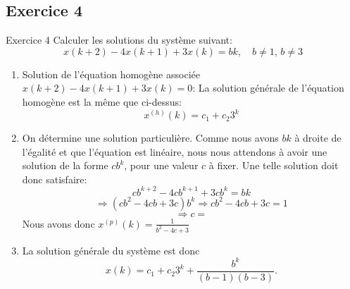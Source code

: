          \subsection{Exercice 4}
            \begin{exercise}{Exercice 4}
                Calculer les solutions du système suivant: 
                \begin{equation}
                    x(k+2)-4x(k+1)+3x(k) = bk, \quad b \neq 1, \, b \neq 3
                \end{equation}
            \end{exercise}
            \begin{enumerate}
                \item Solution de l’équation homogène associée $x(k+2)-4x(k+1)+3x(k) = 0$:
                La solution générale de l’équation homogène est la même que ci-dessus:
                \begin{equation}
                x^{(h)}(k) = c_1+c_2 3^k
                \end{equation}
                \item On détermine une solution particulière. Comme nous avons $bk$ à droite de l’égalité et que l’équation est linéaire, nous nous attendons à avoir une solution de la forme $c b^k$, pour une valeur $c$ à fixer. Une telle solution doit donc satisfaire:
                \begin{equation}
                    cb^{k+2}-4cb^{k+1}+3cb^{k} = bk
                \end{equation}
                \begin{equation}
                    \Rightarrow (cb^2-4cb+3c)b^k \Rightarrow cb^2-4cb+3c = 1
                \end{equation}
                \begin{equation}
                    \Rightarrow c =
                \end{equation}
                Nous avons donc $x^{(p)}(k) = \frac 1{b^2-4c+3}$
                \item La solution générale du système est donc
                \begin{equation}
                    x(k) = c_1+c_2 3^k + \frac {b^k}{(b-1)(b-3)}.
                \end{equation}
            \end{enumerate}
